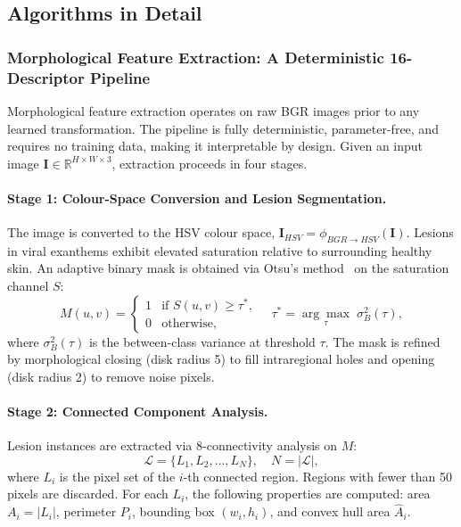 \documentclass[preprint,12pt]{elsarticle}
\begin{document}
\subsection{Algorithms in Detail}
\label{sec:algorithms}

\subsubsection{Morphological Feature Extraction: A Deterministic
               16-Descriptor Pipeline}
\label{sec:morph_features}

Morphological feature extraction operates on raw BGR images prior to any
learned transformation.  The pipeline is fully deterministic,
parameter-free, and requires no training data, making it interpretable
by design.  Given an input image
$\mathbf{I} \in \mathbb{R}^{H \times W \times 3}$, extraction proceeds
in four stages.

\paragraph{Stage 1: Colour-Space Conversion and Lesion Segmentation.}
The image is converted to the HSV colour space,
$\mathbf{I}_{HSV} = \phi_{BGR\to HSV}(\mathbf{I})$.  Lesions in viral
exanthems exhibit elevated saturation relative to surrounding healthy
skin.  An adaptive binary mask is obtained via Otsu's
method~\cite{otsu1979} on the saturation channel $S$:
\begin{equation}
  M(u,v) =
  \begin{cases}
    1 & \text{if } S(u,v) \geq \tau^*,\\
    0 & \text{otherwise,}
  \end{cases}
  \quad
  \tau^* = \underset{\tau}{\arg\max}\;\sigma_B^2(\tau),
  \label{eq:otsu}
\end{equation}
where $\sigma_B^2(\tau)$ is the between-class variance at threshold
$\tau$.  The mask is refined by morphological closing (disk radius 5)
to fill intraregional holes and opening (disk radius 2) to remove
noise pixels.

\paragraph{Stage 2: Connected Component Analysis.}
Lesion instances are extracted via 8-connectivity analysis on $M$:
\begin{equation}
  \mathcal{L} = \{L_1, L_2, \ldots, L_N\},\quad N = |\mathcal{L}|,
  \label{eq:components}
\end{equation}
where $L_i$ is the pixel set of the $i$-th connected region.  Regions
with fewer than 50 pixels are discarded.  For each $L_i$, the following
properties are computed: area $A_i = |L_i|$, perimeter $P_i$, bounding
box $(w_i, h_i)$, and convex hull area $\hat{A}_i$.
\end{document}
